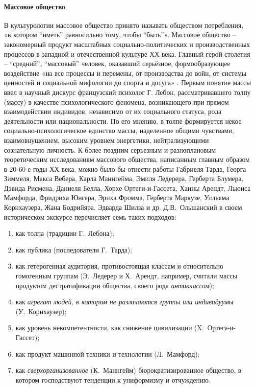 \paragraph{Массовое общество}\label{1.1.1}

В культурологии массовое общество принято называть обществом потребления, «в котором “иметь” равносильно тому, чтобы “быть”»\autocite[][199]{razlogov2005}. Массовое общество – закономерный продукт масштабных социально-политических  и производственных процессов в западной и отечественной культуре ХХ века. Главный герой столетия – “средний”, “массовый” человек, оказавший серьёзное, формообразующее воздействие «на все процессы и перемены, от производства до войн, от системы ценностей и социальной мифологии до спорта и досуга» \autocite{levada2001}. Первым понятие массы ввел в научный дискурс французский психолог Г. Лебон, рассматривавшего толпу (массу) в качестве психологического феномена, возникающего при прямом взаимодействии индивидов, независимо от их социального статуса, рода деятельности или национальности. По его мнению, в толпе формируется некое социально-психологическое единство массы, наделенное общими чувствами, взаимовнушением, высоким уровнем энергетики, нейтрализующими сознательную личность. К более поздним серьезным и разноплановым теоретическим исследованиям массового общества, написанным главным образом в 20-60-е годы ХХ века, можно было бы отнести работы Габриеля Тарда, Георга Зиммеля,
Макса Вебера, Карла Маннгейма, Эмиля Ледерера, Герберта Блумера, Дэвида Рисмена,
Даниеля Белла, Хорхе Ортеги-и-Гассета, Ханны Арендт, Льюиса Мамфорда, Фридриха Юнгера,
Эриха Фромма, Герберта Маркузе, Уильяма Корнхаузера, Жана Бодрийяра, Эдварда Шилза и др. Д.В.~Ольшанский в своем историческом экскурсе\autocite[][15]{olshansky}
перечисляет семь таких подходов:
\begin{enumerate}[label={\arabic*)}]
    \item как толпа (традиции Г.~Лебона);
    \item как публика (последователи Г.~Тарда);
    \item как гетерогенная аудитория, противостоящая классам и относительно гомогенным
    группам (Э.~Ледерер и Х.~Арендт, например, считали массы продуктом дестратификации
    общества, своего рода \emph{антиклассом});
    \item как \emph{агрегат людей, в котором не различаются группы или индивидуумы} (У.~Корнхаузер);
    \item как уровень некомпетентности, как снижение цивилизации (X.~Ортега-и-Гассет);
    \item как продукт машинной техники и технологии (Л.~Мамфорд);
    \item как \emph{сверхорганизованное} (К.~Маннгейм) бюрократизированное общество,
    в котором господствуют тенденции к униформизму и отчуждению.
\end{enumerate}

